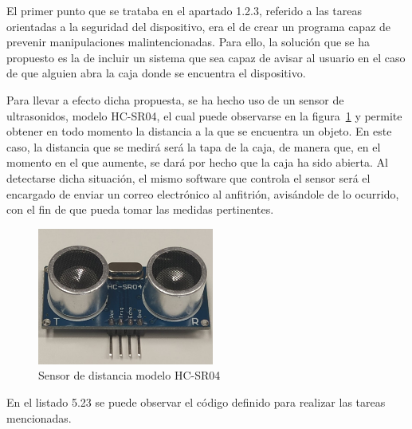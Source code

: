 El primer punto que se trataba en el apartado 1.2.3, referido a las tareas orientadas a la seguridad del dispositivo, era el de crear un programa capaz de prevenir manipulaciones malintencionadas. Para ello, la solución que se ha propuesto es la de incluir un sistema que sea capaz de avisar al usuario en el caso de que alguien abra la caja donde se encuentra el dispositivo. 

Para llevar a efecto dicha propuesta, se ha hecho uso de un sensor de ultrasonidos, modelo HC-SR04, el cual puede observarse en la figura~\ref{fig:sensor-detector-distancia} y permite obtener en todo momento la distancia a la que se encuentra un objeto. En este caso, la distancia que se medirá será la tapa de la caja, de manera que, en el momento en el que aumente, se dará por hecho que la caja ha sido abierta. Al detectarse dicha situación, el mismo software que controla el sensor será el encargado de enviar un correo electrónico al anfitrión, avisándole de lo ocurrido, con el fin de que pueda tomar las medidas pertinentes.

\begin{figure}[tbp]
\centering
\includegraphics[height=4.5cm]{fig/Sensor-HC-SR04.jpg}
\caption{Sensor de distancia modelo HC-SR04}
\label{fig:sensor-detector-distancia}
\end{figure}

En el listado 5.23 se puede observar el código definido para realizar las tareas mencionadas.

